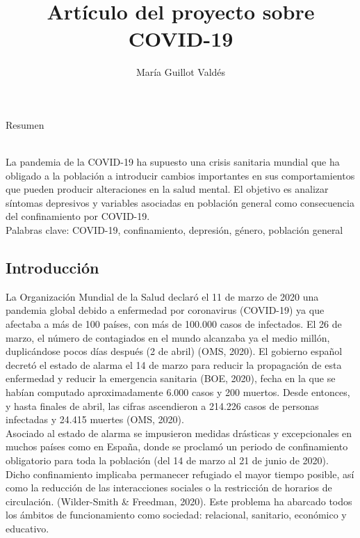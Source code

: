 \documentclass[a4paper,11pt]{article}
\begin{document}
\title{Artículo del proyecto sobre COVID-19}
\author{María Guillot Valdés}
\maketitle
\begin{center}
Resumen
\begin{center}
\begin{flushleft}
\\La pandemia de la COVID-19 ha supuesto una crisis sanitaria mundial que ha obligado a la población a introducir cambios importantes en sus comportamientos que pueden producir alteraciones en la salud mental. El objetivo es analizar síntomas depresivos y variables asociadas en población general como consecuencia del confinamiento por COVID-19.\\Palabras clave: COVID-19, confinamiento, depresión,  género, población general
\begin{flushleft}
\part{Introducción}
\begin{flushleft}
La Organización Mundial de la Salud declaró el 11 de marzo de 2020 una pandemia global debido a enfermedad por coronavirus (COVID-19) ya que afectaba a más de 100 países, con más de 100.000 casos de infectados. El 26 de marzo, el número de contagiados en el mundo alcanzaba ya el medio millón, duplicándose pocos días después (2 de abril) (OMS, 2020). El gobierno español decretó el estado de alarma el 14 de marzo para reducir la propagación de esta enfermedad y reducir la emergencia sanitaria (BOE, 2020), fecha en la que se habían computado aproximadamente 6.000 casos y 200 muertos. Desde entonces, y hasta finales de abril, las cifras ascendieron a 214.226 casos de personas infectadas y 24.415 muertes (OMS, 2020). \\
Asociado al estado de alarma se impusieron medidas drásticas y excepcionales en muchos países como en España, donde se proclamó un periodo de confinamiento obligatorio para toda la población (del 14 de marzo al 21 de junio de 2020). Dicho confinamiento implicaba permanecer refugiado el mayor tiempo posible,  así como la reducción de las interacciones sociales o la restricción de horarios de circulación. (Wilder-Smith & Freedman, 2020). Este problema ha abarcado todos los ámbitos de funcionamiento como sociedad: relacional, sanitario, económico y  educativo. 

\end{flushleft}
\end{flushleft}
\end{flushleft}
\end{center}
\end{center}
\end{document}
